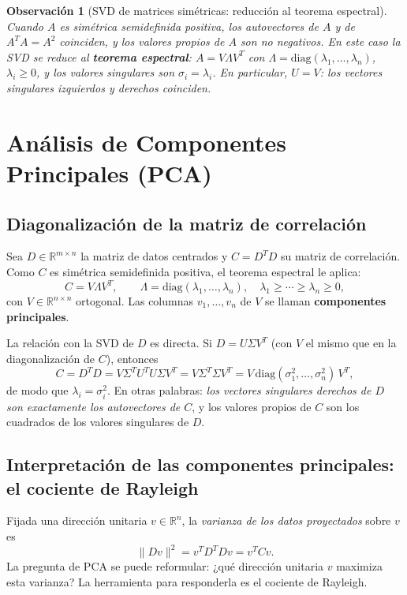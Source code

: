 \documentclass[12pt]{article}
\newtheorem{remark}[theorem]{Observación}
\newcommand{\R}{\mathbb{R}}
\begin{document}
\begin{remark}[SVD de matrices simétricas: reducción al teorema espectral]
Cuando $A$ es simétrica semidefinida positiva, los autovectores de $A$ y de $A^TA = A^2$ coinciden, y los valores propios de $A$ son no negativos. En este caso la SVD se reduce al \textbf{teorema espectral}: $A = V\Lambda V^T$ con $\Lambda = \mathrm{diag}(\lambda_1,\ldots,\lambda_n)$, $\lambda_i \geq 0$, y los valores singulares son $\sigma_i = \lambda_i$. En particular, $U = V$: los vectores singulares izquierdos y derechos coinciden.
\end{remark}

\section{Análisis de Componentes Principales (PCA)}

\subsection{Diagonalización de la matriz de correlación}

Sea $D \in \R^{m \times n}$ la matriz de datos centrados y $C = D^T D$ su matriz de correlación. Como $C$ es simétrica semidefinida positiva, el teorema espectral le aplica:
\[
  C = V \Lambda V^T, \qquad \Lambda = \mathrm{diag}(\lambda_1, \ldots, \lambda_n), \quad \lambda_1 \geq \cdots \geq \lambda_n \geq 0,
\]
con $V \in \R^{n \times n}$ ortogonal. Las columnas $v_1, \ldots, v_n$ de $V$ se llaman \textbf{componentes principales}.

La relación con la SVD de $D$ es directa. Si $D = U \Sigma V^T$ (con $V$ el mismo que en la diagonalización de $C$), entonces
\[
  C = D^T D = V \Sigma^T U^T U \Sigma V^T = V \Sigma^T \Sigma V^T = V \,\mathrm{diag}(\sigma_1^2, \ldots, \sigma_n^2)\, V^T,
\]
de modo que $\lambda_i = \sigma_i^2$. En otras palabras: \emph{los vectores singulares derechos de $D$ son exactamente los autovectores de $C$}, y los valores propios de $C$ son los cuadrados de los valores singulares de $D$.

\subsection{Interpretación de las componentes principales: el cociente de Rayleigh}

Fijada una dirección unitaria $v \in \R^n$, la \emph{varianza de los datos proyectados} sobre $v$ es
\[
  \|Dv\|^2 = v^T D^T D v = v^T C v.
\]
La pregunta de PCA se puede reformular: ¿qué dirección unitaria $v$ maximiza esta varianza? La herramienta para responderla es el cociente de Rayleigh.
\end{document}
